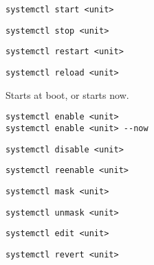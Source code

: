 \begin{verbatim}
systemctl start <unit>
\end{verbatim}

\begin{verbatim}
systemctl stop <unit>
\end{verbatim}

\begin{verbatim}
systemctl restart <unit>
\end{verbatim}

\begin{verbatim}
systemctl reload <unit>
\end{verbatim}

Starts at boot, or starts now.
\begin{verbatim}
systemctl enable <unit>
systemctl enable <unit> --now
\end{verbatim}

\begin{verbatim}
systemctl disable <unit>
\end{verbatim}

\begin{verbatim}
systemctl reenable <unit>
\end{verbatim}

\begin{verbatim}
systemctl mask <unit>
\end{verbatim}

\begin{verbatim}
systemctl unmask <unit>
\end{verbatim}

\begin{verbatim}
systemctl edit <unit>
\end{verbatim}

\begin{verbatim}
systemctl revert <unit>
\end{verbatim}


